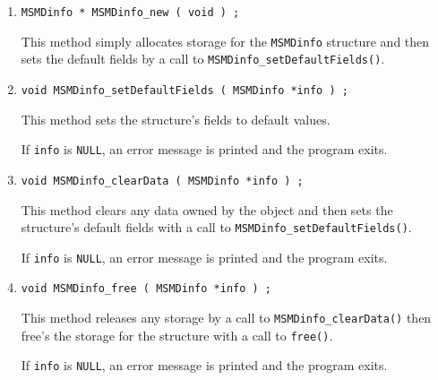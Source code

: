 \begin{enumerate}
\item
\begin{verbatim}
MSMDinfo * MSMDinfo_new ( void ) ;
\end{verbatim}
This method simply allocates storage for the {\tt MSMDinfo} structure 
and then sets the default fields by a call to 
{\tt MSMDinfo\_setDefaultFields()}.
\item
\begin{verbatim}
void MSMDinfo_setDefaultFields ( MSMDinfo *info ) ;
\end{verbatim}
This method sets the structure's fields to default values.
\par {}
If {\tt info} is {\tt NULL},
an error message is printed and the program exits.
\item
\begin{verbatim}
void MSMDinfo_clearData ( MSMDinfo *info ) ;
\end{verbatim}
This method clears any data owned by the object
and then sets the structure's default fields 
with a call to {\tt MSMDinfo\_setDefaultFields()}.
\par {}
If {\tt info} is {\tt NULL},
an error message is printed and the program exits.
\item
\begin{verbatim}
void MSMDinfo_free ( MSMDinfo *info ) ;
\end{verbatim}
This method releases any storage by a call to 
{\tt MSMDinfo\_clearData()} then free's the storage for the 
structure with a call to {\tt free()}.
\par {}
If {\tt info} is {\tt NULL},
an error message is printed and the program exits.
\end{enumerate}
\par
